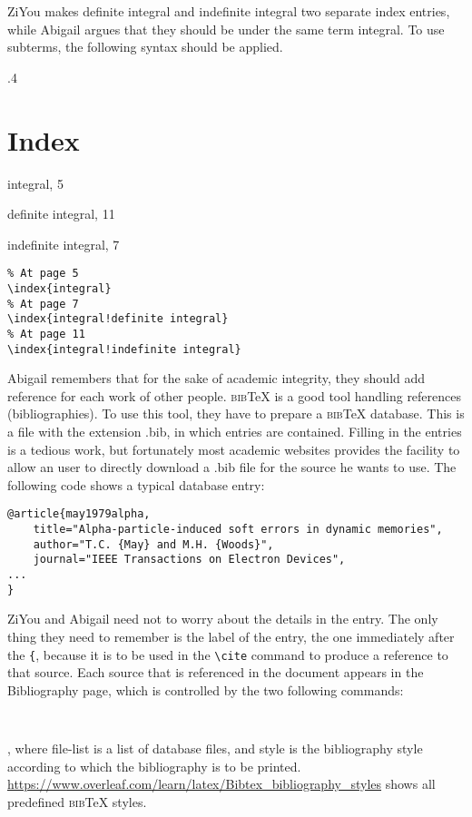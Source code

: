 ZiYou makes definite integral and indefinite integral two separate index entries, while Abigail argues that they should be under the same term integral. To use subterms, the following syntax should be applied.
\begin{miniexammar}{.4\textandmarginlen}{
\section*{Index}
integral, 5
\par \hspace{2em} definite integral, 11
\par \hspace{2em} indefinite integral, 7
}
\begin{lstlisting}
% At page 5
\index{integral}
% At page 7
\index{integral!definite integral}
% At page 11
\index{integral!indefinite integral}
\end{lstlisting}
\end{miniexammar}

Abigail remembers that for the sake of academic integrity, they should add reference for each work of other people. \textsc{bib}\TeX{} is a good tool handling references (bibliographies). To use this tool, they have to prepare a \textsc{bib}\TeX{} database. This is a file with the extension .bib, in which entries are contained. Filling in the entries is a tedious work, but fortunately most academic websites provides the facility to allow an user to directly download a .bib file for the source he wants to use. The following code shows a typical database entry:
\begin{lstlisting}
@article{may1979alpha,
	title="Alpha-particle-induced soft errors in dynamic memories",
	author="T.C. {May} and M.H. {Woods}",
	journal="IEEE Transactions on Electron Devices",
...
}
\end{lstlisting}
ZiYou and Abigail need not to worry about the details in the entry. The only thing they need to remember is the label of the entry, the one immediately after the \verb={=, because it is to be used in the \verb=\cite= command to produce a reference to that source. Each source that is referenced in the document appears in the Bibliography page, which is controlled by the two following commands:
\begin{lstlisting}


\end{lstlisting}
, where file-list is a list of database files, and style is the bibliography style according to which the bibliography is to be printed. \url{https://www.overleaf.com/learn/latex/Bibtex_bibliography_styles} shows all predefined \textsc{bib}\TeX{} styles.